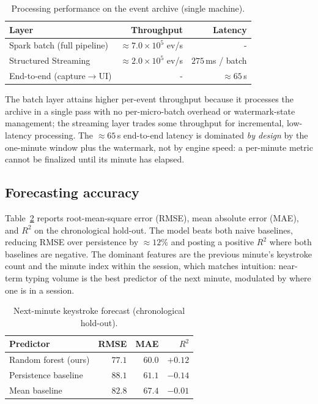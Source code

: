 \documentclass[conference]{IEEEtran}
\begin{document}
\begin{table}[t]
\caption{Processing performance on the event archive (single machine).}
\label{tab:perf}
\centering
\begin{tabular}{lrr}
\toprule
Layer & Throughput & Latency \\
\midrule
Spark batch (full pipeline) & $\approx\!7.0\times10^{5}$ ev/s & - \\
Structured Streaming        & $\approx\!2.0\times10^{5}$ ev/s & $275$\,ms / batch \\
End-to-end (capture$\to$UI) & -                             & $\approx\!65$\,s \\
\bottomrule
\end{tabular}
\end{table}

The batch layer attains higher per-event throughput because it processes
the archive in a single pass with no per-micro-batch overhead or
watermark-state management; the streaming layer trades some throughput
for incremental, low-latency processing. The $\approx\!65$\,s end-to-end
latency is dominated \emph{by design} by the one-minute window plus the
watermark, not by engine speed: a per-minute metric cannot be finalized
until its minute has elapsed.

\subsection{Forecasting accuracy}
Table~\ref{tab:ml} reports root-mean-square error (RMSE), mean absolute
error (MAE), and $R^2$ on the chronological hold-out. The model beats both
naive baselines, reducing RMSE over persistence by $\approx\!12\%$ and
posting a positive $R^2$ where both baselines are negative. The dominant
features are the previous minute's keystroke count and the minute index
within the session, which matches intuition: near-term typing volume is
the best predictor of the next minute, modulated by where one is in a
session.

\begin{table}[t]
\caption{Next-minute keystroke forecast (chronological hold-out).}
\label{tab:ml}
\centering
\begin{tabular}{lrrr}
\toprule
Predictor & RMSE & MAE & $R^2$ \\
\midrule
Random forest (ours) & $77.1$ & $60.0$ & $+0.12$ \\ %
Persistence baseline & $88.1$ & $61.1$ & $-0.14$ \\ %
Mean baseline        & $82.8$ & $67.4$ & $-0.01$ \\ %
\bottomrule
\end{tabular}
\end{table}
\end{document}
